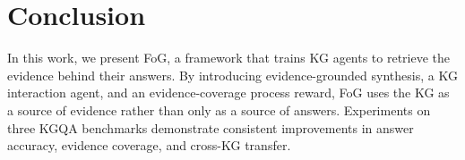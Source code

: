 \section{Conclusion}

In this work, we present FoG, a framework that trains KG agents to retrieve the evidence behind their answers. By introducing evidence-grounded synthesis, a KG interaction agent, and an evidence-coverage process reward, FoG uses the KG as a source of evidence rather than only as a source of answers. Experiments on three KGQA benchmarks demonstrate consistent improvements in answer accuracy, evidence coverage, and cross-KG transfer.
